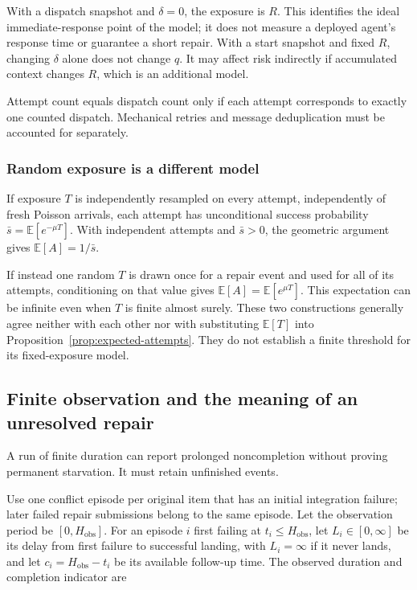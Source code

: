\documentclass[pdflatex,sn-mathphys-ay]{sn-jnl}
\theoremstyle{thmstyleone}
\theoremstyle{thmstylethree}
\begin{document}
\begin{appendices}
With a dispatch snapshot and \(\delta=0\), the exposure is \(R\). This identifies the ideal immediate-response point of the model; it does not measure a deployed agent's response time or guarantee a short repair. With a start snapshot and fixed \(R\), changing \(\delta\) alone does not change \(q\). It may affect risk indirectly if accumulated context changes \(R\), which is an additional model.

Attempt count equals dispatch count only if each attempt corresponds to exactly one counted dispatch. Mechanical retries and message deduplication must be accounted for separately.

\subsubsection{Random exposure is a different model}\label{app:random-exposure}

If exposure \(T\) is independently resampled on every attempt, independently of fresh Poisson arrivals, each attempt has unconditional success probability \(\bar s=\mathbb E[e^{-\mu T}]\). With independent attempts and \(\bar s>0\), the geometric argument gives \(\mathbb E[A]=1/\bar s\).

If instead one random \(T\) is drawn once for a repair event and used for all of its attempts, conditioning on that value gives \(\mathbb E[A]=\mathbb E[e^{\mu T}]\). This expectation can be infinite even when \(T\) is finite almost surely. These two constructions generally agree neither with each other nor with substituting \(\mathbb E[T]\) into Proposition~\ref{prop:expected-attempts}. They do not establish a finite threshold for its fixed-exposure model.

\subsection{Finite observation and the meaning of an unresolved repair}\label{app:finite-window}

A run of finite duration can report prolonged noncompletion without proving permanent starvation. It must retain unfinished events.

Use one conflict episode per original item that has an initial integration failure; later failed repair submissions belong to the same episode. Let the observation period be \([0,H_{\mathrm{obs}}]\). For an episode \(i\) first failing at \(t_i\le H_{\mathrm{obs}}\), let \(L_i\in[0,\infty]\) be its delay from first failure to successful landing, with \(L_i=\infty\) if it never lands, and let \(c_i=H_{\mathrm{obs}}-t_i\) be its available follow-up time. The observed duration and completion indicator are


\end{appendices}
\end{document}
